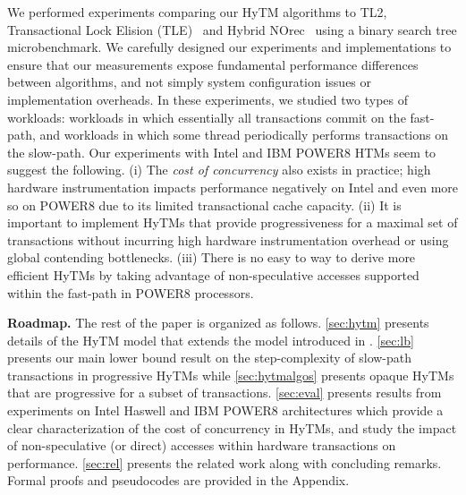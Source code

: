 We performed experiments comparing our HyTM algorithms to TL2, Transactional Lock Elision (TLE)~\cite{tle} and Hybrid NOrec~\cite{hynorecriegel} 
using a binary search tree microbenchmark.
We carefully designed our experiments and implementations to ensure that our measurements expose fundamental performance differences between algorithms, and not simply system configuration issues or implementation overheads.
In these experiments, we studied two types of workloads: workloads in which essentially all transactions commit on the fast-path, 
and workloads in which some thread periodically performs transactions on the slow-path.
Our experiments with Intel and IBM POWER8 HTMs seem to suggest the following.
(i) The \emph{cost of concurrency} also exists in practice; high hardware instrumentation impacts performance negatively on Intel and even more so on POWER8 due to its limited transactional cache capacity.
(ii) It is important to implement HyTMs that provide progressiveness for a maximal set of transactions without incurring high hardware instrumentation overhead or using global contending bottlenecks.
(iii) There is no easy to way to derive more efficient HyTMs by taking advantage of non-speculative accesses supported within the fast-path in POWER8 processors. %

\vspace{1mm}\noindent\textbf{Roadmap.}
The rest of the paper is organized as follows.
\cref{sec:hytm} presents details of the HyTM model that extends the model introduced in \cite{htmdisc15}.
\cref{sec:lb} presents our main lower bound result on the step-complexity of slow-path transactions in progressive HyTMs
while \cref{sec:hytmalgos} presents opaque HyTMs that are progressive for a subset of transactions.
\cref{sec:eval} presents results from experiments on Intel Haswell and IBM POWER8 architectures which provide a clear characterization of the cost
of concurrency in HyTMs, and study the impact of %
non-speculative (or direct) accesses within hardware transactions on performance.
\cref{sec:rel} presents the related work along with concluding remarks. Formal proofs and pseudocodes are provided in the Appendix.
%